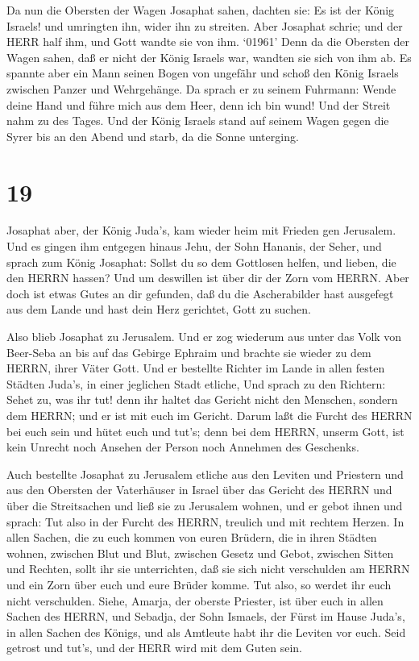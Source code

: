  Da nun die Obersten der Wagen Josaphat sahen, dachten sie:
Es ist der König Israels! und umringten ihn, wider ihn zu streiten. Aber
Josaphat schrie; und der HERR half ihm, und Gott wandte sie von ihm.
 `01961' Denn da die Obersten der Wagen sahen, daß er nicht
der König Israels war, wandten sie sich von ihm ab.  Es
spannte aber ein Mann seinen Bogen von ungefähr und schoß den König
Israels zwischen Panzer und Wehrgehänge. Da sprach er zu seinem
Fuhrmann: Wende deine Hand und führe mich aus dem Heer, denn ich bin
wund!  Und der Streit nahm zu des Tages. Und der König
Israels stand auf seinem Wagen gegen die Syrer bis an den Abend und
starb, da die Sonne unterging.

\hypertarget{section-18}{%
\section{19}\label{section-18}}

 Josaphat aber, der König Juda's, kam wieder heim mit
Frieden gen Jerusalem.  Und es gingen ihm entgegen hinaus
Jehu, der Sohn Hananis, der Seher, und sprach zum König Josaphat: Sollst
du so dem Gottlosen helfen, und lieben, die den HERRN hassen? Und um
deswillen ist über dir der Zorn vom HERRN.  Aber doch ist
etwas Gutes an dir gefunden, daß du die Ascherabilder hast ausgefegt aus
dem Lande und hast dein Herz gerichtet, Gott zu suchen.

 Also blieb Josaphat zu Jerusalem. Und er zog wiederum aus
unter das Volk von Beer-Seba an bis auf das Gebirge Ephraim und brachte
sie wieder zu dem HERRN, ihrer Väter Gott.  Und er bestellte
Richter im Lande in allen festen Städten Juda's, in einer jeglichen
Stadt etliche,  Und sprach zu den Richtern: Sehet zu, was
ihr tut! denn ihr haltet das Gericht nicht den Menschen, sondern dem
HERRN; und er ist mit euch im Gericht.  Darum laßt die
Furcht des HERRN bei euch sein und hütet euch und tut's; denn bei dem
HERRN, unserm Gott, ist kein Unrecht noch Ansehen der Person noch
Annehmen des Geschenks.

 Auch bestellte Josaphat zu Jerusalem etliche aus den
Leviten und Priestern und aus den Obersten der Vaterhäuser in Israel
über das Gericht des HERRN und über die Streitsachen und ließ sie zu
Jerusalem wohnen,  und er gebot ihnen und sprach: Tut also
in der Furcht des HERRN, treulich und mit rechtem Herzen. 
In allen Sachen, die zu euch kommen von euren Brüdern, die in ihren
Städten wohnen, zwischen Blut und Blut, zwischen Gesetz und Gebot,
zwischen Sitten und Rechten, sollt ihr sie unterrichten, daß sie sich
nicht verschulden am HERRN und ein Zorn über euch und eure Brüder komme.
Tut also, so werdet ihr euch nicht verschulden.  Siehe,
Amarja, der oberste Priester, ist über euch in allen Sachen des HERRN,
und Sebadja, der Sohn Ismaels, der Fürst im Hause Juda's, in allen
Sachen des Königs, und als Amtleute habt ihr die Leviten vor euch. Seid
getrost und tut's, und der HERR wird mit dem Guten sein.

